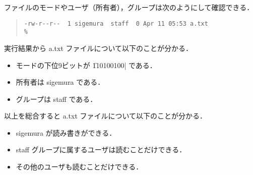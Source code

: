 \documentclass{beamer}                 %
\begin{document}
\begin{frame}[fragile]
ファイルのモードやユーザ（所有者），グループは次のようにして確認できる．

\begin{quote}
\begin{lstlisting}[numbers=none]
% ls -l a.txt
-rw-r--r--  1 sigemura  staff  0 Apr 11 05:53 a.txt
%
\end{lstlisting}
\end{quote}

実行結果から a.txt ファイルについて以下のことが分かる．
\begin{itemize}
\item モードの下位9ビットが \|110100100| である．
\item 所有者は sigemura である．
\item グループは staff である．
\end{itemize}

以上を総合すると a.txt ファイルについて以下のことが分かる．
\begin{itemize}
\item sigemura が読み書きができる．
\item staff グループに属するユーザは読むことだけできる．
\item その他のユーザも読むことだけできる．
\end{itemize}
\end{frame}
\end{document}
